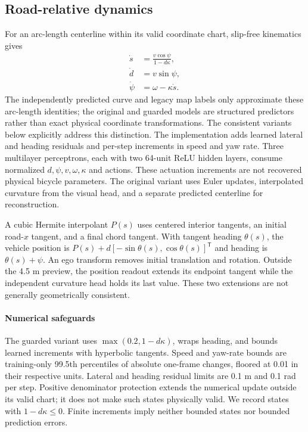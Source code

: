 \documentclass[preprint,12pt]{elsarticle}
\begin{document}
\subsection{Road-relative dynamics}\label{sec:prediction}
For an arc-length centerline within its valid coordinate chart, slip-free
kinematics gives
\begin{align}
 \dot s&=\frac{v\cos\psi}{1-d\kappa},\label{eq:frenet_s}\\
 \dot d&=v\sin\psi,\label{eq:frenet_d}\\
 \dot\psi&=\omega-\kappa\dot s.\label{eq:frenet_psi}
\end{align}
The independently predicted curve and legacy map labels only approximate
these arc-length identities; the original and guarded models are structured
predictors rather than exact physical coordinate transformations. The
consistent variants below explicitly address this distinction.
The implementation adds learned lateral and heading residuals and per-step
increments in speed and yaw rate. Three multilayer perceptrons, each with two 64-unit ReLU hidden layers, consume
normalized $d,\psi,v,\omega,\kappa$ and actions. These actuation increments are
not recovered physical bicycle parameters. The original variant uses Euler
updates, interpolated curvature from the visual head, and a separate predicted
centerline for reconstruction.

A cubic Hermite interpolant $P(s)$ uses centered interior tangents, an initial
road-$x$ tangent, and a final chord tangent. With tangent heading $\theta(s)$,
the vehicle position is $P(s)+d[-\sin\theta(s),\cos\theta(s)]^{\mathsf T}$ and
heading is $\theta(s)+\psi$. An ego transform removes initial translation and
rotation. Outside the 4.5 m preview, the position readout extends its endpoint
tangent while the independent curvature head holds its last value. These two
extensions are not generally geometrically consistent.

\paragraph{Numerical safeguards}
The guarded variant uses $\max(0.2,1-d\kappa)$, wraps heading, and bounds learned
increments with hyperbolic tangents. Speed and yaw-rate bounds are training-only
99.5th percentiles of absolute one-frame changes, floored at 0.01 in their
respective units. Lateral and heading residual limits are 0.1 m and 0.1 rad
per step. Positive denominator protection extends the numerical update outside
its valid chart; it does not make such states physically valid. We record states
with $1-d\kappa\leq0$. Finite increments imply neither bounded states nor
bounded prediction errors.
\end{document}
